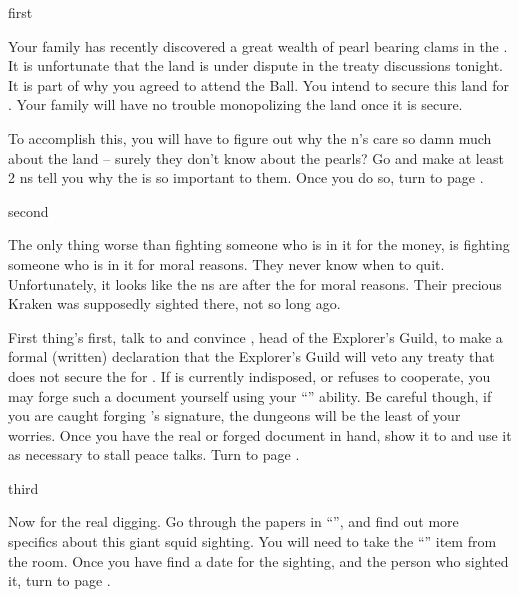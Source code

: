 \documentclass[greennotebook]{NeptuneBall}
\begin{document}

\startnotebook{\nGazaStrip{}}

\begin{page}{first}

Your family has recently discovered a great wealth of pearl bearing clams in the \pGazaStrip{}. It is unfortunate that the land is under dispute in the treaty discussions tonight. It is part of why you agreed to attend the \cExExKing{} Ball. You intend to secure this land for \pAtlantis{}. Your family will have no trouble monopolizing the land once it is secure. 

To accomplish this, you will have to figure out why the \pPacifica{}n's care so damn much about the land -- surely they don't know about the pearls? Go and make at least 2 \pPacifica{}ns tell you why the \pGazaStrip{} is so important to them. Once you do so, turn to page .

\end{page}

\begin{page}{second}

The only thing worse than fighting someone who is in it for the money, is fighting someone who is in it for moral reasons. They never know when to quit. Unfortunately, it looks like the \pPacifica{}ns are after the \pGazaStrip{} for moral reasons. Their precious Kraken was supposedly sighted there, not so long ago.

First thing's first, talk to \cPlant{} and convince \cPlant{\them}, head of the Explorer's Guild, to make a formal (written) declaration that the Explorer's Guild will veto any treaty that does not secure the \pGazaStrip{} for \pAtlantis{}. If \cPlant{\they} is currently indisposed, or refuses to cooperate, you may forge such a document yourself using your ``\aForge{}'' ability. Be careful though, if you are caught forging \cPlant{}'s signature, the dungeons will be the least of your worries. Once you have the real or forged document in hand, show it to \cKing{\King} \cKing{} and use it as necessary to stall peace talks. Turn to page .

\end{page}

\begin{page}{third}

Now for the real digging. Go through the papers in ``\sPrince{}'', and find out more specifics about this giant squid sighting. You will need to take the ``\iReference{}'' item from the room. Once you have find a date for the sighting, and the person who sighted it, turn to page .

\end{page}
\end{document}
